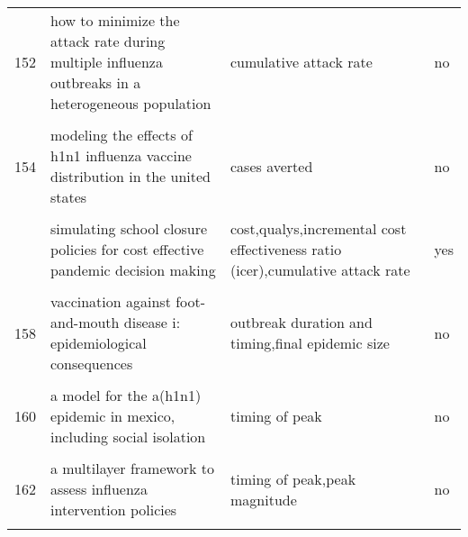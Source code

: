 \documentclass[
]{article}
\begin{document}
\begin{landscape}
\begin{longtable}{l>{\raggedright\arraybackslash}p{4cm}>{\raggedright\arraybackslash}p{6cm}l}
152 & how to minimize the attack rate during multiple influenza outbreaks in a heterogeneous population & cumulative attack rate & no\\
\cellcolor{gray!6}{153} & \cellcolor{gray!6}{modeling strategies for controlling h1n1 outbreaks in china} & \cellcolor{gray!6}{attack rate} & \cellcolor{gray!6}{no}\\
154 & modeling the effects of h1n1 influenza vaccine distribution in the united states & cases averted & no\\
\cellcolor{gray!6}{155} & \cellcolor{gray!6}{modeling the impact of air, sea, and land travel restrictions supplemented by other interventions on the emergence of a new influenza pandemic virus} & \cellcolor{gray!6}{timing of peak,attack rate} & \cellcolor{gray!6}{yes}\\
\addlinespace
156 & simulating school closure policies for cost effective pandemic decision making & cost,qualys,incremental cost effectiveness ratio (icer),cumulative attack rate & yes\\
\cellcolor{gray!6}{157} & \cellcolor{gray!6}{the impact of school closures on pandemic influenza: assessing potential repercussions using a seasonal sir model} & \cellcolor{gray!6}{final epidemic size,timing of peak} & \cellcolor{gray!6}{no}\\
158 & vaccination against foot-and-mouth disease i: epidemiological consequences & outbreak duration and timing,final epidemic size & no\\
\cellcolor{gray!6}{159} & \cellcolor{gray!6}{a deterministic resource scheduling model in epidemic control: a case study} & \cellcolor{gray!6}{final epidemic size} & \cellcolor{gray!6}{yes}\\
160 & a model for the a(h1n1) epidemic in mexico, including social isolation & timing of peak & no\\
\addlinespace
\cellcolor{gray!6}{161} & \cellcolor{gray!6}{a model to evaluate mass vaccination against pneumococcus as a countermeasure against pandemic influenza} & \cellcolor{gray!6}{campaign duration,hospitalizations,case fatality} & \cellcolor{gray!6}{yes}\\
162 & a multilayer framework to assess influenza intervention policies & timing of peak,peak magnitude & no\\
\cellcolor{gray!6}{163} & \cellcolor{gray!6}{a note on the use of optimal control on a discrete time model of influenza dynamics} & \cellcolor{gray!6}{final epidemic size,cost,incidence} & \cellcolor{gray!6}{yes}\\

\end{longtable}
\end{landscape}
\end{document}
